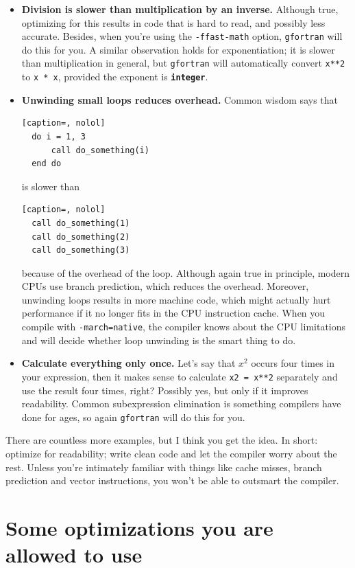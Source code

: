 \documentclass[openany,oneside]{report}
\newcommand{\keyword}[1]{\texttt{\bfseries\color{DarkBlue}#1}}
\begin{document}
\begin{itemize}
  \item\textbf{Division is slower than multiplication by an inverse.} Although true, optimizing for this results in code that is hard to read, and possibly less accurate.
    Besides, when you're using the \texttt{-ffast-math} option, \texttt{gfortran} will do this for you.
    A similar observation holds for exponentiation; it is slower than multiplication in general, but \texttt{gfortran} will automatically convert \texttt{x**2} to \texttt{x * x}, provided the exponent is \keyword{integer}.
  \item\textbf{Unwinding small loops reduces overhead.} Common wisdom says that
\begin{lstlisting}[caption=, nolol]
  do i = 1, 3
      call do_something(i)
  end do
\end{lstlisting}
    is slower than
\begin{lstlisting}[caption=, nolol]
  call do_something(1)
  call do_something(2)
  call do_something(3)
\end{lstlisting}
    because of the overhead of the loop.
    Although again true in principle, modern CPUs use branch prediction, which reduces the overhead.
    Moreover, unwinding loops results in more machine code, which might actually hurt performance if it no longer fits in the CPU instruction cache.
    When you compile with \texttt{-march=native}, the compiler knows about the CPU limitations and will decide whether loop unwinding is the smart thing to do.
  \item\textbf{Calculate everything only once.} Let's say that $x^2$ occurs four times in your expression, then it makes sense to calculate \texttt{x2 = x**2} separately and use the result four times, right? Possibly yes, but only if it improves readability.
    Common subexpression elimination is something compilers have done for ages, so again \texttt{gfortran} will do this for you.
\end{itemize}
There are countless more examples, but I think you get the idea.
In short: optimize for readability; write clean code and let the compiler worry about the rest.
Unless you're intimately familiar with things like cache misses, branch prediction and vector instructions, you won't be able to outsmart the compiler.

\section{Some optimizations you are allowed to use}
\end{document}
